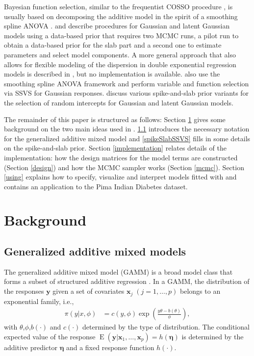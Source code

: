 \documentclass[article, shortnames, nojss, noheadings, notitle]{jss}
\newcommand{\EW}{\operatorname{E}}
\begin{document}
Bayesian function selection, similar to the frequentist COSSO procedure
\citep{Lin:Zhang:2006}, is usually based on decomposing the additive
model in the spirit of a smoothing spline
ANOVA \citep{Wahba:Wang:Gu:1995}. \citet{Wood:Kohn:2002} and
\citet{Yau:Kohn:Wood:2003} describe procedures for Gaussian and
latent Gaussian models using a
data-based prior that requires two MCMC runs, a pilot run to obtain
a data-based prior for the slab part and a second one to
estimate parameters and select model components. A more general
approach that also allows for flexible modeling of the dispersion in double exponential regression
models is described in \citet{Cottet:Kohn:Nott:2008}, but
no implementation is available.
\citet{Reich:Storlie:Bondell:2009} also use the smoothing spline
ANOVA framework and perform variable and function selection via SSVS
for Gaussian responses. \citet{Fruehwirt:Wagner:2010} discuss various spike-and-slab
prior variants for the selection of random intercepts for Gaussian and
latent Gaussian models.


The remainder of this paper is structured as follows:
Section \ref{background} gives some background on the two main ideas used in .
\ref{gamm} introduces the necessary notation for
the generalized additive mixed model and \ref{spikeSlabSSVS} fills in some details on the spike-and-slab prior.
Section \ref{implementation} relates
details of the implementation: how the design matrices for the model terms are constructed (Section \ref{design}) and
how the MCMC sampler works (Section \ref{mcmc}). Section \ref{using} explains how to specify, visualize
and interpret models fitted with  and contains an application to the Pima Indian Diabetes dataset.

\newpage

\section{Background}\label{background}
\subsection{Generalized additive mixed models}\label{gamm}

The generalized additive mixed model (GAMM) is a broad model class
that forms a subset of structured additive regression
\citep{Fahr:Kneib:Lang:2004}. In a GAMM, the distribution of the responses $\bm{y}$ given a set of covariates $\bm x_j\;
(j=1,\dots,p)$ belongs to an exponential family, i.e.,
\begin{align*}
    \pi(y |x, \phi) &= c(y, \phi)\exp\left(\frac{
    y \theta- b(\theta)}{\phi}\right),
\end{align*}
with $\theta$,$\phi$,$b(\cdot)$ and $c(\cdot)$ determined by the type of
distribution.
The conditional expected value of the response $\EW(\bm y | \bm x_1,\ldots, \bm x_p) = h(\bm \eta)$
is determined by the additive predictor $\bm \eta$ and a fixed response function $h(\cdot)$.
\end{document}
